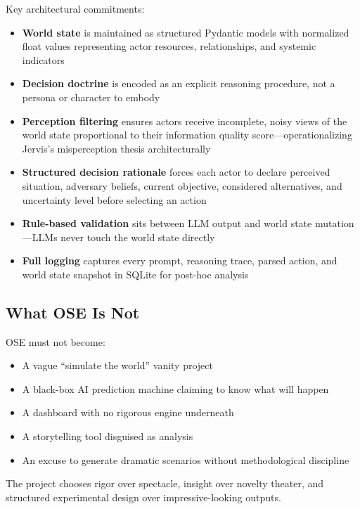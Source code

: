 \documentclass[12pt, a4paper]{article}
\begin{document}
Key architectural commitments:
\begin{itemize}[leftmargin=1.5em]
    \item \textbf{World state} is maintained as structured Pydantic models with normalized float values representing actor resources, relationships, and systemic indicators
    \item \textbf{Decision doctrine} is encoded as an explicit reasoning procedure, not a persona or character to embody
    \item \textbf{Perception filtering} ensures actors receive incomplete, noisy views of the world state proportional to their information quality score---operationalizing Jervis's misperception thesis architecturally
    \item \textbf{Structured decision rationale} forces each actor to declare perceived situation, adversary beliefs, current objective, considered alternatives, and uncertainty level before selecting an action
    \item \textbf{Rule-based validation} sits between LLM output and world state mutation---LLMs never touch the world state directly
    \item \textbf{Full logging} captures every prompt, reasoning trace, parsed action, and world state snapshot in SQLite for post-hoc analysis
\end{itemize}

\subsection{What OSE Is Not}

OSE must not become:
\begin{itemize}[leftmargin=1.5em]
    \item A vague ``simulate the world'' vanity project
    \item A black-box AI prediction machine claiming to know what will happen
    \item A dashboard with no rigorous engine underneath
    \item A storytelling tool disguised as analysis
    \item An excuse to generate dramatic scenarios without methodological discipline
\end{itemize}

The project chooses rigor over spectacle, insight over novelty theater, and structured experimental design over impressive-looking outputs.

\end{document}
